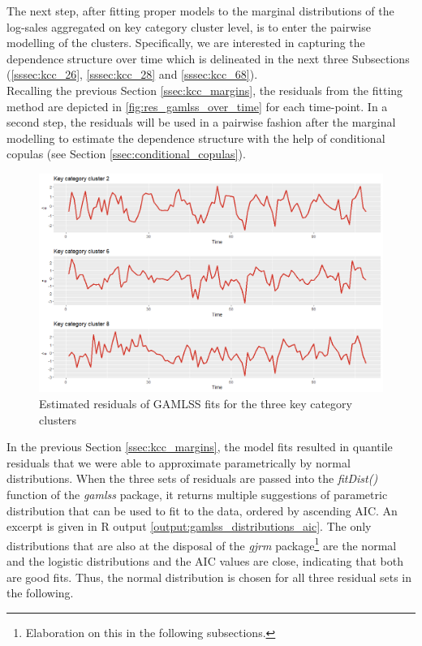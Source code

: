
The next step, after fitting proper models to the marginal distributions of the log-sales aggregated on key category cluster level, is to enter the pairwise modelling of the clusters. Specifically, we are interested in capturing the dependence structure over time which is delineated in the next three Subsections (\ref{sssec:kcc_26}, \ref{sssec:kcc_28} and \ref{sssec:kcc_68}).
\\

Recalling the previous Section \ref{ssec:kcc_margins}, the residuals from the fitting method are depicted in \autoref{fig:res_gamlss_over_time} for each time-point. In a second step, the residuals will be used in a pairwise fashion after the marginal modelling to estimate the dependence structure with the help of conditional copulas (see Section \ref{ssec:conditional_copulas}).

\begin{figure}[H]
\centering
  \includegraphics[width=0.95\linewidth]{figures/res_gamlss_over_time.png}
  \caption{Estimated residuals of GAMLSS fits for the three key category clusters}
  \label{fig:res_gamlss_over_time}
\end{figure}









In the previous Section \ref{ssec:kcc_margins}, the model fits resulted in quantile residuals that we were able to approximate parametrically by normal distributions. When the three sets of residuals are passed into the \textit{fitDist()} function of the \textit{gamlss} package, it returns multiple suggestions of parametric distribution that can be used to fit to the data, ordered by ascending \ac{AIC}. An excerpt is given in R output \ref{output:gamlss_distributions_aic}. The only distributions that are also at the disposal of the \textit{gjrm} package\footnote{Elaboration on this in the following subsections.} are the normal and the logistic distributions and the \ac{AIC} values are close, indicating that both are good fits. Thus, the normal distribution is chosen for all three residual sets in the following.


